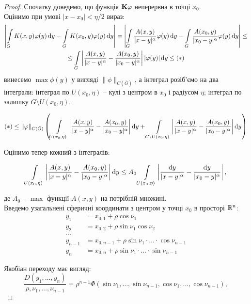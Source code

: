 \begin{proof}
	Спочатку доведемо, що функція $\bf{K}\phi$ неперервна в точці $x_0$. \\

	Оцінимо при умові $|x - x_0| < \eta / 2$ вираз:
	\begin{multline*}
		\left| \Int_G K(x, y) \phi(y) \diff y - \Int_G K(x_0, y) \phi(y) \diff y \right| = \left| \Int_G \dfrac{A(x, y)}{|x - y|^\alpha} \phi(y) \diff y - \Int_G \dfrac{A(x_0, y)}{|x_0 - y|^\alpha} \phi(y) \diff y \right| \le \\
		\le \Int_G \left|\dfrac{A(x, y)}{|x - y|^\alpha} - \dfrac{A(x_0, y)}{|x_0 - y|^\alpha}\right| |\phi(y)| \diff y \le (*)
	\end{multline*}
	винесемо $\max \phi(y)$ у вигляді $\|\phi\|_{C(\bar G)}$, а інтеграл розіб’ємо на два інтеграли: інтеграл по $U(x_0, \eta)$ -- кулі з центром в $x_0$ і радіусом $\eta$; інтеграл по залишку $G \setminus U(x_0, \eta)$.
	
	\[ (*) \le \|\phi\|_{C(\bar G)} \left( \Int_{U(x_0, \eta)} \left|\dfrac{A(x, y)}{|x - y|^\alpha} - \dfrac{A(x_0, y)}{|x_0 - y|^\alpha}\right| \diff y + \Int_{G \setminus U(x_0, \eta)} \left|\dfrac{A(x, y)}{|x - y|^\alpha} - \dfrac{A(x_0, y)}{|x_0 - y|^\alpha}\right| \diff y\right) \]
	
	Оцінимо тепер кожний з інтегралів:
	
	\[ \Int_{U(x_0, \eta)} \left|\dfrac{A(x, y)}{|x - y|^\alpha} - \dfrac{A(x_0, y)}{|x_0 - y|^\alpha}\right| \diff y \le A_0 \Int_{U(x_0, \eta)} \left|\dfrac{\diff y}{|x - y|^\alpha} - \dfrac{\diff y}{|x_0 - y|^\alpha}\right|, \]

	де $A_0$ -- $\max$ функції $A(x, y)$ на потрібній множині. \\ 

	Введемо узагальнені сферичні координати з центром у точці $x_0$ в просторі $\RR^n$:
	\begin{align*} 
		y_1 &= x_{0, 1} + \rho \cos \nu_1 \\
		y_2 &= x_{0, 2} + \rho \sin \nu_1 \cos \nu_2 \\
		\ldots \\
		y_{n - 1} &= x_{0, n - 1} + \rho \sin \nu_1 \cdot \ldots \cdot \cos \nu_{n - 1} \\
		y_n &= x_{0, n} + \rho \sin \nu_1 \cdot \ldots \cdot \sin \nu_{n - 1}
	\end{align*}

	Якобіан переходу має вигляд:
	\[ \dfrac{D(y_1, \ldots, y_n)}{\rho, \nu_1, \ldots, \nu_{n - 1}} = \rho^{n - 1} \Phi(\sin \nu_1, \ldots, \sin \nu_{n - 1}, \cos \nu_1, \ldots, \cos \nu_{n - 1}), \]


\end{proof}
